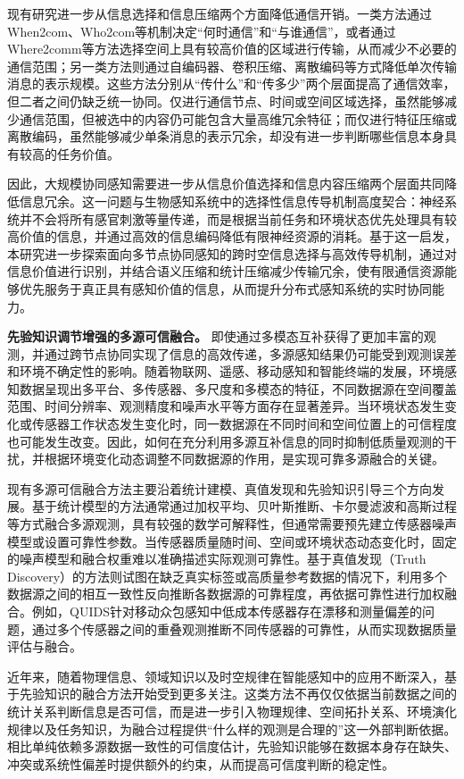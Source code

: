 现有研究进一步从信息选择和信息压缩两个方面降低通信开销。一类方法通过When2com、Who2com等机制决定“何时通信”和“与谁通信”，或者通过Where2comm等方法选择空间上具有较高价值的区域进行传输，从而减少不必要的通信范围；另一类方法则通过自编码器、卷积压缩、离散编码等方式降低单次传输消息的表示规模。这些方法分别从“传什么”和“传多少”两个层面提高了通信效率，但二者之间仍缺乏统一协同。仅进行通信节点、时间或空间区域选择，虽然能够减少通信范围，但被选中的内容仍可能包含大量高维冗余特征；而仅进行特征压缩或离散编码，虽然能够减少单条消息的表示冗余，却没有进一步判断哪些信息本身具有较高的任务价值。

因此，大规模协同感知需要进一步从信息价值选择和信息内容压缩两个层面共同降低信息冗余。这一问题与生物感知系统中的选择性信息传导机制高度契合：神经系统并不会将所有感官刺激等量传递，而是根据当前任务和环境状态优先处理具有较高价值的信息，并通过高效的信息编码降低有限神经资源的消耗。基于这一启发，本研究进一步探索面向多节点协同感知的跨时空信息选择与高效传导机制，通过对信息价值进行识别，并结合语义压缩和统计压缩减少传输冗余，使有限通信资源能够优先服务于真正具有感知价值的信息，从而提升分布式感知系统的实时协同能力。

\textbf{先验知识调节增强的多源可信融合。}
即使通过多模态互补获得了更加丰富的观测，并通过跨节点协同实现了信息的高效传递，多源感知结果仍可能受到观测误差和环境不确定性的影响。随着物联网、遥感、移动感知和智能终端的发展，环境感知数据呈现出多平台、多传感器、多尺度和多模态的特征，不同数据源在空间覆盖范围、时间分辨率、观测精度和噪声水平等方面存在显著差异。当环境状态发生变化或传感器工作状态发生变化时，同一数据源在不同时间和空间位置上的可信程度也可能发生改变。因此，如何在充分利用多源互补信息的同时抑制低质量观测的干扰，并根据环境变化动态调整不同数据源的作用，是实现可靠多源融合的关键。

现有多源可信融合方法主要沿着统计建模、真值发现和先验知识引导三个方向发展。基于统计模型的方法通常通过加权平均、贝叶斯推断、卡尔曼滤波和高斯过程等方式融合多源观测，具有较强的数学可解释性，但通常需要预先建立传感器噪声模型或设置可靠性参数。当传感器质量随时间、空间或环境状态动态变化时，固定的噪声模型和融合权重难以准确描述实际观测可靠性。基于真值发现（Truth Discovery）的方法则试图在缺乏真实标签或高质量参考数据的情况下，利用多个数据源之间的相互一致性反向推断各数据源的可靠程度，再依据可靠性进行加权融合。例如，QUIDS针对移动众包感知中低成本传感器存在漂移和测量偏差的问题，通过多个传感器之间的重叠观测推断不同传感器的可靠性，从而实现数据质量评估与融合。

近年来，随着物理信息、领域知识以及时空规律在智能感知中的应用不断深入，基于先验知识的融合方法开始受到更多关注。这类方法不再仅仅依据当前数据之间的统计关系判断信息是否可信，而是进一步引入物理规律、空间拓扑关系、环境演化规律以及任务知识，为融合过程提供“什么样的观测是合理的”这一外部判断依据。相比单纯依赖多源数据一致性的可信度估计，先验知识能够在数据本身存在缺失、冲突或系统性偏差时提供额外的约束，从而提高可信度判断的稳定性。


